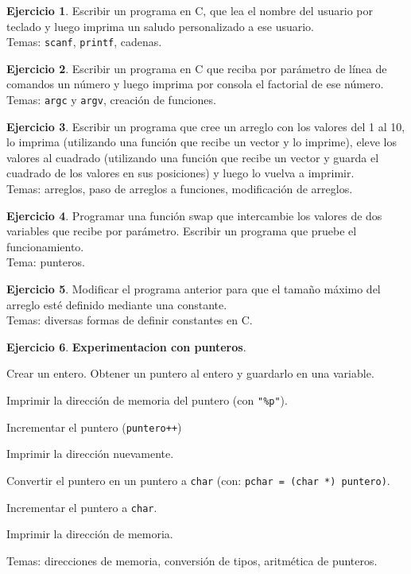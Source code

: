\documentclass[11pt,a4paper]{article}
\theoremstyle{definition}
\newtheorem{ejercicio}{Ejercicio}[section]
\begin{document}
\begin{ejercicio}
Escribir un programa en C, que lea el nombre del usuario por teclado y
luego imprima un saludo personalizado a ese usuario. \\
Temas: \lstinline!scanf!, \lstinline!printf!, cadenas.
\end{ejercicio}

\begin{ejercicio}
Escribir un programa en C que reciba por parámetro de línea de comandos un
número y luego imprima por consola el factorial de ese número. \\
Temas: \lstinline!argc! y \lstinline!argv!, creación de funciones.
\end{ejercicio}

\begin{ejercicio}
Escribir un programa que cree un arreglo con los valores del 1 al 10, lo
imprima (utilizando una función que recibe un vector y lo imprime), eleve los
valores al cuadrado (utilizando una función que recibe un vector y guarda el
cuadrado de los valores en sus posiciones) y luego lo vuelva a imprimir. \\
Temas: arreglos, paso de arreglos a funciones, modificación de arreglos.
\end{ejercicio}

\begin{ejercicio}
Programar una función swap que intercambie los valores de dos variables que
recibe por parámetro. Escribir un programa que pruebe el funcionamiento. \\
Tema: punteros.
\end{ejercicio}

\begin{ejercicio}
Modificar el programa anterior para que el tamaño máximo del arreglo esté
definido mediante una constante. \\
Temas: diversas formas de definir constantes en C.
\end{ejercicio}

\begin{ejercicio}
\textbf{Experimentacion con punteros}.
\begin{partes}
\item Crear un entero. Obtener un puntero al entero y guardarlo en una
variable.
\item Imprimir la dirección de memoria del puntero (con \lstinline!"%p"!).
\item Incrementar el puntero (\lstinline!puntero++!)
\item Imprimir la dirección nuevamente.
\item Convertir el puntero en un puntero a \lstinline!char! (con:
\lstinline!pchar = (char *) puntero)!.
\item Incrementar el puntero a \lstinline!char!.
\item Imprimir la dirección de memoria.
\end{partes}
Temas: direcciones de memoria, conversión de tipos, aritmética de punteros.
\end{ejercicio}
\end{document}
